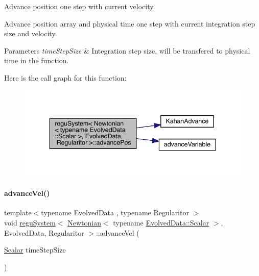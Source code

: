 Advance position one step with current velocity. 

Advance position array and physical time one step with current integration step size and velocity. 
\begin{DoxyParams}{Parameters}
{\em time\+Step\+Size} & Integration step size, will be transfered to physical time in the function. \\
\hline
\end{DoxyParams}
Here is the call graph for this function\+:\nopagebreak
\begin{figure}[H]
\begin{center}
\leavevmode
\includegraphics[width=343pt]{classregu_system_3_01_newtonian_3_01typename_01_evolved_data_1_1_scalar_01_4_00_01_evolved_data_00_01_regularitor_01_4_ae0b6977439ce7171e5ef5767237e050d_cgraph}
\end{center}
\end{figure}
\mbox{\label{classregu_system_3_01_newtonian_3_01typename_01_evolved_data_1_1_scalar_01_4_00_01_evolved_data_00_01_regularitor_01_4_a04de03e59e9369cae79251b8ab876c2c}} 
\paragraph{\texorpdfstring{advance\+Vel()}{advanceVel()}}
{\footnotesize\ttfamily template$<$typename Evolved\+Data , typename Regularitor $>$ \\
void \mbox{\hyperlink{classregu_system}{regu\+System}}$<$ \mbox{\hyperlink{class_newtonian}{Newtonian}}$<$ typename \mbox{\hyperlink{classregu_system_aca8ee2c387943164ee3ea68370fc3ac0}{Evolved\+Data\+::\+Scalar}} $>$, Evolved\+Data, Regularitor $>$\+::advance\+Vel (\begin{DoxyParamCaption}\item[{\mbox{\hyperlink{classregu_system_3_01_newtonian_3_01typename_01_evolved_data_1_1_scalar_01_4_00_01_evolved_data_00_01_regularitor_01_4_a6993f135075541f441a7642845b183a5}{Scalar}}}]{time\+Step\+Size }\end{DoxyParamCaption})}



